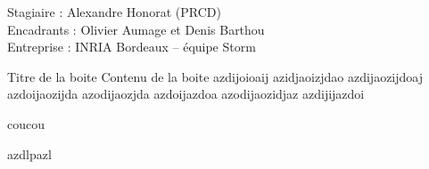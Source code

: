 \documentclass[a4paper]{article}
\newcommand{\intern}{Alexandre Honorat (PRCD)}
\newcommand{\tutor}{Olivier Aumage et Denis Barthou}
\newcommand{\companyname}{INRIA Bordeaux -- équipe Storm}
\begin{document}
\begin{center}

\vspace*{0.5cm}

  {\large Stagiaire : \intern}\\
  {\large Encadrants : \tutor}\\
  {\large Entreprise : \companyname}

\vspace{1cm}

\begin{bclogo}[couleur=black!10,couleurBord=black!50,arrondi=0.1,logo=\hspace{17pt},barre=none]{Titre de la boite}
Contenu de la boite azdijoioaij azidjaoizjdao azdijaozijdoaj azdoijaozijda azodijaozjda azdoijazdoa azodijaozidjaz azdijijazdoi

coucou

azdlpazl
\end{bclogo}

\end{center}
\end{document}
